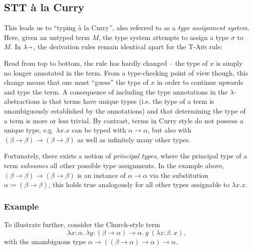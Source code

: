 \subsection{STT à la Curry}
This leads us to ``typing à la Curry'',
also referred to as a \emph{type assignment system}.
Here, given an untyped term $M$, the type system attempts to assign a type $\sigma$ to $M$.
In $\lambda\kern -.25em \shortrightarrow$, the derivation rules remain identical apart for the \textsc{T-Abs} rule:

\begin{center}
    \begin{prooftreecustom}
    \end{prooftreecustom}
\end{center}\vspace{2mm}

Read from top to bottom, the rule has hardly changed -- the type of $x$ is simply no longer annotated
in the term.
From a type-checking point of view though, this change means that one must ``guess'' the type of $x$
in order to continue upwards and type the term.
A consequence of including the type annotations in the $\lambda$-abstractions
is that terms have unique types
(i.e. the type of a term is unambiguously established by the annotations)
and that determining the type of a term is more or less trivial.
%
By contrast, terms in Curry style do not possess a unique type, e.g.
$\lambda x. x$ can be typed with $\alpha \to \alpha$, but also with
$(\beta \to \beta) \to (\beta \to \beta)$ as well as infinitely many
other types.

Fortunately, there exists a notion of \emph{principal types}, where
the principal type of a term \emph{subsumes} all other possible type
assignments.
In the example above, $(\beta \to \beta) \to (\beta \to \beta)$
is an instance of $\alpha \to \alpha$ via the
substitution $\alpha \coloneqq (\beta \to \beta)$,
this holds true analogously for all other types assignable to $\lambda x. x$.

\subsubsection{Example}
To illustrate further, consider the Church-style term
\[ \lambda x : \alpha.\ \lambda y : (\beta \to \alpha) \to \alpha.\
    y\ (\lambda z : \beta.\ x), \]
with the unambiguous type
$\alpha \to ((\beta \to \alpha) \to \alpha) \to \alpha$.

